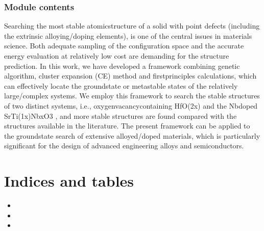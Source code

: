 \documentclass[letterpaper,10pt,english]{sphinxmanual}
\begin{document}
\subsection{Module contents}
\label{\detokenize{pygace:module-pygace}}\label{\detokenize{pygace:module-contents}}
\sphinxAtStartPar
Searching the most stable atomic\sphinxhyphen{}structure of a solid with point defects
(including the extrinsic alloying/doping elements), is one of the central issues in
materials science. Both adequate sampling of the configuration space and the
accurate energy evaluation at relatively low cost are demanding for the structure
prediction. In this work, we have developed a framework combining genetic
algorithm, cluster expansion (CE) method and first\sphinxhyphen{}principles calculations, which
can effectively locate the ground\sphinxhyphen{}state or meta\sphinxhyphen{}stable states of the relatively
large/complex systems. We employ this framework to search the stable structures
of two distinct systems, i.e., oxygen\sphinxhyphen{}vacancy\sphinxhyphen{}containing HfO(2\sphinxhyphen{}x) and the
Nb\sphinxhyphen{}doped SrTi(1\sphinxhyphen{}x)NbxO3 , and more stable structures are found compared with
the structures available in the literature. The present framework can be applied
to the ground\sphinxhyphen{}state search of extensive alloyed/doped materials, which is
particularly significant for the design of advanced engineering alloys and
semiconductors.


\chapter{Indices and tables}
\label{\detokenize{index:indices-and-tables}}\begin{itemize}
\item {} 
\sphinxAtStartPar
{}

\item {} 
\sphinxAtStartPar
{}

\item {} 
\sphinxAtStartPar
{}

\end{itemize}
\end{document}
